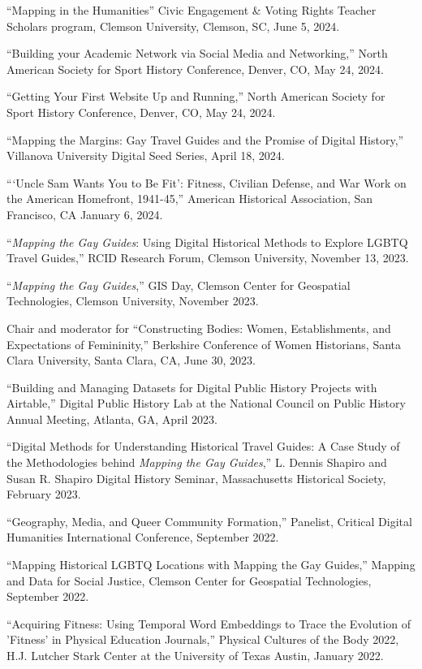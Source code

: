 \documentclass[11pt]{article}
\begin{document}
``Mapping in the Humanities'' Civic Engagement & Voting Rights Teacher Scholars program, Clemson University, Clemson, SC, June 5, 2024.

``Building your Academic Network via Social Media and Networking,'' North American Society for Sport History Conference, Denver, CO, May 24, 2024.

``Getting Your First Website Up and Running,'' North American Society for Sport History Conference, Denver, CO, May 24, 2024.

``Mapping the Margins: Gay Travel Guides and the Promise of Digital History,'' Villanova University Digital Seed Series, April 18, 2024.

```Uncle Sam Wants You to Be Fit': Fitness, Civilian Defense, and War Work on the American Homefront, 1941-45,'' American Historical Association, San Francisco, CA January 6, 2024.

``\emph{Mapping the Gay Guides}: Using Digital Historical Methods to Explore LGBTQ Travel Guides,'' RCID Research Forum, Clemson University, November 13, 2023.

``\emph{Mapping the Gay Guides},'' GIS Day, Clemson Center for Geospatial Technologies, Clemson University, November 2023. 

Chair and moderator for ``Constructing Bodies: Women, Establishments, and Expectations of Femininity,'' Berkshire Conference of Women Historians, Santa Clara University, Santa Clara, CA, June 30, 2023.

``Building and Managing Datasets for Digital Public History Projects with Airtable,'' Digital Public History Lab at the National Council on Public History Annual Meeting, Atlanta, GA, April 2023. 

``Digital Methods for Understanding Historical Travel Guides: A Case Study of the Methodologies behind \emph{Mapping the Gay Guides},'' L. Dennis Shapiro and Susan R. Shapiro Digital History Seminar, Massachusetts Historical Society, February 2023. 

``Geography, Media, and Queer Community Formation,'' Panelist, Critical Digital Humanities International Conference, September 2022.

``Mapping Historical LGBTQ Locations with Mapping the Gay Guides,'' Mapping and Data for Social Justice, Clemson Center for Geospatial Technologies, September 2022.

``Acquiring Fitness: Using Temporal Word Embeddings to Trace the Evolution of 'Fitness' in Physical Education Journals,'' Physical Cultures of the Body 2022, H.J. Lutcher Stark Center at the University of Texas Austin, January 2022.
\end{document}
